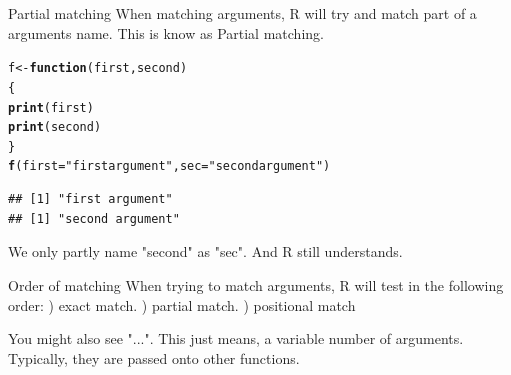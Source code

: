 \documentclass{beamer}\usepackage[]{graphicx}\usepackage[]{color}
\makeatletter
\newcommand{\hlstr}[1]{\textcolor[rgb]{0.192,0.494,0.8}{#1}}%
\newcommand{\hlstd}[1]{\textcolor[rgb]{0.345,0.345,0.345}{#1}}%
\newcommand{\hlkwa}[1]{\textcolor[rgb]{0.161,0.373,0.58}{\textbf{#1}}}%
\newcommand{\hlkwb}[1]{\textcolor[rgb]{0.69,0.353,0.396}{#1}}%
\newcommand{\hlkwc}[1]{\textcolor[rgb]{0.333,0.667,0.333}{#1}}%
\newcommand{\hlkwd}[1]{\textcolor[rgb]{0.737,0.353,0.396}{\textbf{#1}}}%
\newenvironment{kframe}{%
 \def\at@end@of@kframe{}%
 \ifinner\ifhmode%
  \def\at@end@of@kframe{\end{minipage}}%
  \begin{minipage}{\columnwidth}%
 \fi\fi%
 \def\FrameCommand##1{\hskip\@totalleftmargin \hskip-\fboxsep
 \colorbox{shadecolor}{##1}\hskip-\fboxsep
     \hskip-\linewidth \hskip-\@totalleftmargin \hskip\columnwidth}%
 \MakeFramed {\advance\hsize-\width
   \@totalleftmargin\z@ \linewidth\hsize
   \@setminipage}}%
 {\par\unskip\endMakeFramed%
 \at@end@of@kframe}
\newenvironment{knitrout}{}{} %
\makeatother
\begin{document}
\begin{frame}[fragile]{Partial matching}
When matching arguments, R will try and match part of a arguments name. This is know as Partial matching.
\begin{knitrout}
\color{fgcolor}\begin{kframe}
\begin{alltt}
\hlstd{f} \hlkwb{<-} \hlkwa{function}\hlstd{(}\hlkwc{first}\hlstd{,} \hlkwc{second}\hlstd{)}
\hlstd{\{}
    \hlkwd{print}\hlstd{(first)}
    \hlkwd{print}\hlstd{(second)}
\hlstd{\}}
\hlkwd{f}\hlstd{(}\hlkwc{first}\hlstd{=}\hlstr{"first argument"}\hlstd{,} \hlkwc{sec}\hlstd{=}\hlstr{"second argument"}\hlstd{)}
\end{alltt}
\begin{verbatim}
## [1] "first argument"
## [1] "second argument"
\end{verbatim}
\end{kframe}
\end{knitrout}
We only partly name "second" as "sec". And R still understands.
\end{frame}

\begin{frame}[fragile]{Order of matching}
\linebreak
When trying to match arguments, R will test in the following order:
) exact match.
) partial match.
) positional match
\end{frame}

\begin{frame}[fragile]{}
You might also see "...".
\linebreak
This just means, a variable number of arguments. Typically, they are passed onto other functions.
\end{frame}
\end{document}
